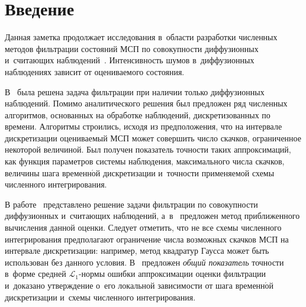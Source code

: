 
  
\vspace*{4pt}



\thispagestyle{headings}

\begin{multicols}{2}

\label{st\stat}


 \section{Введение}
 
\vspace*{-5pt}
 
 Данная заметка продолжает исследования в~об\-ласти разработки чис\-лен\-ных методов 
фильт\-ра\-ции со\-сто\-яний МСП по со\-во\-куп\-ности 
диффузионных и~счи\-та\-ющих наблюдений~\cite{B_20_1_ARC, B_20_2_ARC, B_21_1_IA, B_21_2_IA}. 
Ин\-тен\-сив\-ность шумов в~диффузионных наблюдениях зависит от 
оце\-ни\-ва\-емо\-го со\-сто\-яния.

 В~\cite{B_20_1_ARC, B_20_2_ARC} была решена задача фильт\-ра\-ции при наличии 
только диффузионных наблюдений. Помимо аналитического решения был предложен ряд 
чис\-лен\-ных алгоритмов, основанных на обработке наблюдений, дискретизованных по 
времени. Алгоритмы строились, исходя из предположения, что на интервале 
дискретизации оце\-ни\-ва\-емый МСП может совершить чис\-ло скачков, ограниченное 
некоторой величиной. Был получен показатель точ\-ности таких аппроксимаций, как 
функция па\-ра\-мет\-ров сис\-те\-мы наблюдения, максимального чис\-ла скачков, величины 
шага временн$\acute{\mbox{о}}$й дискретизации и~точ\-ности при\-ме\-ня\-емой схемы чис\-лен\-но\-го 
интегрирования.

 В работе~\cite{B_21_1_IA} пред\-став\-ле\-но решение задачи фильт\-ра\-ции по 
совокупности диффузионных и~счи\-та\-ющих наблюдений, а~в~\cite{B_21_2_IA}  
предложен метод при\-бли\-жен\-но\-го вы\-чис\-ле\-ния данной оценки. Следует отметить, что не 
все схемы чис\-лен\-но\-го интегрирования предполагают ограничение чис\-ла воз\-мож\-ных 
скачков МСП на интервале дискретизации: например, метод квадратур Гаусса может 
быть использован без данного условия. В~\cite{B_21_2_IA} предложен \textit{общий 
показатель} точ\-ности в~фор\-ме средней $\mathcal{L}_1$-нор\-мы ошибки аппроксимации 
оценки фильт\-ра\-ции и~доказано утверж\-де\-ние о~его локальной за\-ви\-си\-мости от шага 
временн$\acute{\mbox{о}}$й дискретизации и~схемы чис\-лен\-но\-го интегрирования.


\end{multicols}
